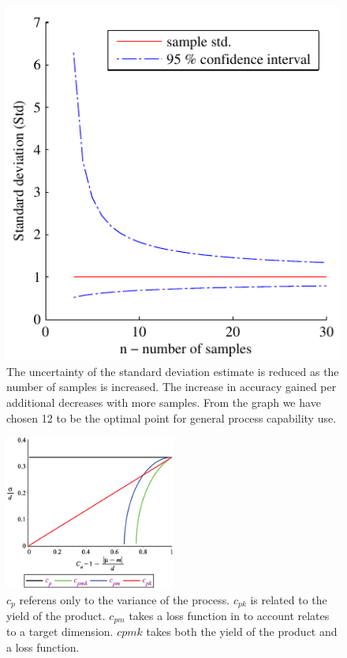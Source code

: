 \documentclass[aip,amsmath, reprint, author-year]{revtex4-1}
\begin{document}
\begin{figure}
\includegraphics{stats_std_confidence.pdf}
\caption{\label{fig:std_uncertainty}The uncertainty of the standard deviation estimate is reduced as the number of samples is increased. The increase in accuracy gained per additional decreases with more samples. From the graph we have chosen 12 to be the optimal point for general process capability use.}
\end{figure}


\begin{figure}
\includegraphics[width=0.5\textwidth]{graph_postscript_test.eps}
\caption{\label{fig:cpk} $c_p$ referens only to the variance of the process. $c_{pk}$ is related to the yield of the product. $c_{pm}$ takes a loss function in to account relates to a target dimension. $cpmk$ takes both the yield of the product and a loss function. }
\end{figure}
\end{document}
